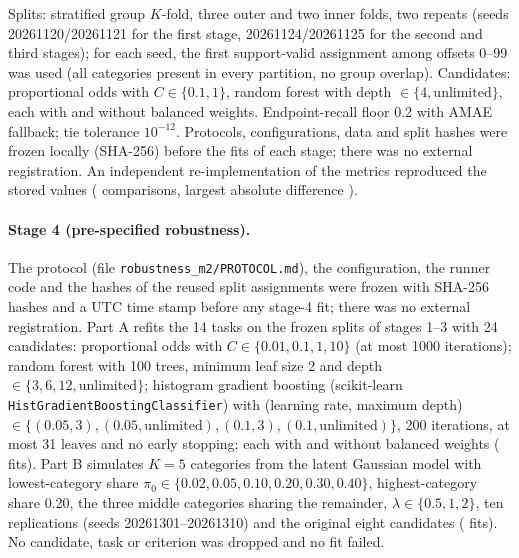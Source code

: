 \documentclass[10pt]{article}
\begin{document}
Splits: stratified group $K$-fold, three outer and two inner folds, two repeats (seeds 20261120/20261121 for the first stage, 20261124/20261125 for the second and third stages); for each seed, the first support-valid assignment among offsets 0--99 was used (all categories present in every partition, no group overlap). Candidates: proportional odds with $C\in\{0.1,1\}$, random forest with depth $\in\{4,\text{unlimited}\}$, each with and without balanced weights. Endpoint-recall floor 0.2 with AMAE fallback; tie tolerance $10^{-12}$. Protocols, configurations, data and split hashes were frozen locally (SHA-256) before the fits of each stage; there was no external registration. An independent re-implementation of the metrics reproduced the stored values (\NRecompute{} comparisons, largest absolute difference \RecomputeMaxDiff{}).

\paragraph{Stage 4 (pre-specified robustness).} The protocol (file \texttt{robustness\_m2/PROTOCOL.md}), the configuration, the runner code and the hashes of the reused split assignments were frozen with SHA-256 hashes and a UTC time stamp before any stage-4 fit; there was no external registration. Part A refits the 14 tasks on the frozen splits of stages 1--3 with 24 candidates: proportional odds with $C\in\{0.01,0.1,1,10\}$ (at most 1000 iterations); random forest with 100 trees, minimum leaf size 2 and depth $\in\{3,6,12,\text{unlimited}\}$; histogram gradient boosting (scikit-learn \texttt{HistGradientBoostingClassifier}) with (learning rate, maximum depth) $\in\{(0.05,3),(0.05,\text{unlimited}),(0.1,3),(0.1,\text{unlimited})\}$, 200 iterations, at most 31 leaves and no early stopping; each with and without balanced weights (\FitsStageFour{} fits). Part B simulates $K=5$ categories from the latent Gaussian model with lowest-category share $\pi_0\in\{0.02,0.05,0.10,0.20,0.30,0.40\}$, highest-category share 0.20, the three middle categories sharing the remainder, $\lambda\in\{0.5,1,2\}$, ten replications (seeds 20261301--20261310) and the original eight candidates (\FitsSimFour{} fits). No candidate, task or criterion was dropped and no fit failed.
\end{document}
